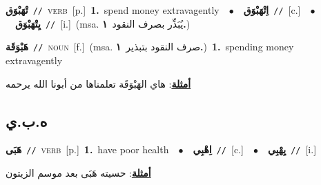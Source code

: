 \documentclass[10pt,a4paper,twoside]{article} %
\begin{document}
\begin{multicols}{2}
{\setlength\topsep{0pt}\textbf{\foreignlanguage{arabic}{تْهَبْوَق}}\ {\color{gray}\texttt{//}\color{black}}\ \textsc{verb}\ [p.]\ \textbf{1.}~spend money extravagently\ \ $\bullet$\ \ \setlength\topsep{0pt}\textbf{\foreignlanguage{arabic}{اِتْهَبْوَق}}\ {\color{gray}\texttt{//}\color{black}}\ [c.]\ \ $\bullet$\ \ \setlength\topsep{0pt}\textbf{\foreignlanguage{arabic}{يِتْهَبْوَق}}\ {\color{gray}\texttt{//}\color{black}}\ [i.]\ \color{gray}(msa. \foreignlanguage{arabic}{يُبَذِّر بصرف النقود}~\foreignlanguage{arabic}{\textbf{١.}})\color{black}\ } \vspace{2mm}

{\setlength\topsep{0pt}\textbf{\foreignlanguage{arabic}{هَبْوَقَة}}\ {\color{gray}\texttt{//}\color{black}}\ \textsc{noun}\ [f.]\ \color{gray}(msa. \foreignlanguage{arabic}{صرف النقود بتبذير}~\foreignlanguage{arabic}{\textbf{١.}})\color{black}\ \textbf{1.}~spending money extravagently\  \begin{flushright}\color{gray}\foreignlanguage{arabic}{\textbf{\underline{\foreignlanguage{arabic}{أمثلة}}}: هاي الهَبْوَقَة تعلمناها من أبونا الله يرحمه}\end{flushright}\color{black}} \vspace{2mm}

\vspace{-3mm}
\subsection*{\color{blue}\foreignlanguage{arabic}{ه.ب.ي}\color{blue}{}} 

{\setlength\topsep{0pt}\textbf{\foreignlanguage{arabic}{هَبَى}}\ {\color{gray}\texttt{//}\color{black}}\ \textsc{verb}\ [p.]\ \textbf{1.}~have poor health\ \ $\bullet$\ \ \setlength\topsep{0pt}\textbf{\foreignlanguage{arabic}{اِهْبِي}}\ {\color{gray}\texttt{//}\color{black}}\ [c.]\ \ $\bullet$\ \ \setlength\topsep{0pt}\textbf{\foreignlanguage{arabic}{يِهْبِي}}\ {\color{gray}\texttt{//}\color{black}}\ [i.]\  \begin{flushright}\color{gray}\foreignlanguage{arabic}{\textbf{\underline{\foreignlanguage{arabic}{أمثلة}}}: حسيته هَبَى  بعد موسم الزيتون}\end{flushright}\color{black}} \vspace{2mm}


\end{multicols}
\end{document}

